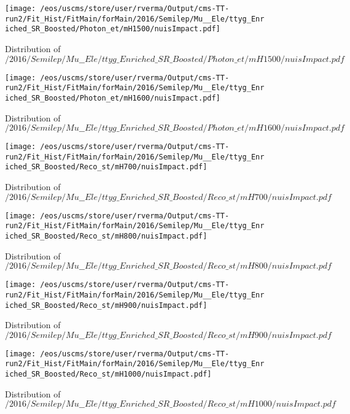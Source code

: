 \begin{figure}
\centering
\texttt{[image: /eos/uscms/store/user/rverma/Output/cms-TT-run2/Fit\_Hist/FitMain/forMain/2016/Semilep/Mu\_\_Ele/ttyg\_Enriched\_SR\_Boosted/Photon\_et/mH1500/nuisImpact.pdf]}
\caption{Distribution of $/2016/Semilep/Mu\_\_Ele/ttyg\_Enriched\_SR\_Boosted/Photon\_et/mH1500/nuisImpact.pdf$}
\end{figure}

\begin{figure}
\centering
\texttt{[image: /eos/uscms/store/user/rverma/Output/cms-TT-run2/Fit\_Hist/FitMain/forMain/2016/Semilep/Mu\_\_Ele/ttyg\_Enriched\_SR\_Boosted/Photon\_et/mH1600/nuisImpact.pdf]}
\caption{Distribution of $/2016/Semilep/Mu\_\_Ele/ttyg\_Enriched\_SR\_Boosted/Photon\_et/mH1600/nuisImpact.pdf$}
\end{figure}

\begin{figure}
\centering
\texttt{[image: /eos/uscms/store/user/rverma/Output/cms-TT-run2/Fit\_Hist/FitMain/forMain/2016/Semilep/Mu\_\_Ele/ttyg\_Enriched\_SR\_Boosted/Reco\_st/mH700/nuisImpact.pdf]}
\caption{Distribution of $/2016/Semilep/Mu\_\_Ele/ttyg\_Enriched\_SR\_Boosted/Reco\_st/mH700/nuisImpact.pdf$}
\end{figure}

\begin{figure}
\centering
\texttt{[image: /eos/uscms/store/user/rverma/Output/cms-TT-run2/Fit\_Hist/FitMain/forMain/2016/Semilep/Mu\_\_Ele/ttyg\_Enriched\_SR\_Boosted/Reco\_st/mH800/nuisImpact.pdf]}
\caption{Distribution of $/2016/Semilep/Mu\_\_Ele/ttyg\_Enriched\_SR\_Boosted/Reco\_st/mH800/nuisImpact.pdf$}
\end{figure}

\begin{figure}
\centering
\texttt{[image: /eos/uscms/store/user/rverma/Output/cms-TT-run2/Fit\_Hist/FitMain/forMain/2016/Semilep/Mu\_\_Ele/ttyg\_Enriched\_SR\_Boosted/Reco\_st/mH900/nuisImpact.pdf]}
\caption{Distribution of $/2016/Semilep/Mu\_\_Ele/ttyg\_Enriched\_SR\_Boosted/Reco\_st/mH900/nuisImpact.pdf$}
\end{figure}

\begin{figure}
\centering
\texttt{[image: /eos/uscms/store/user/rverma/Output/cms-TT-run2/Fit\_Hist/FitMain/forMain/2016/Semilep/Mu\_\_Ele/ttyg\_Enriched\_SR\_Boosted/Reco\_st/mH1000/nuisImpact.pdf]}
\caption{Distribution of $/2016/Semilep/Mu\_\_Ele/ttyg\_Enriched\_SR\_Boosted/Reco\_st/mH1000/nuisImpact.pdf$}
\end{figure}


